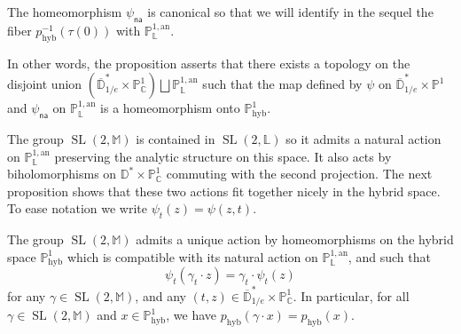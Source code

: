 \documentclass[AHL,Unicode,longabstracts]{cedram}
\DeclareMathOperator{\hyb}{hyb}
\DeclareMathOperator{\SL}{SL}
\newcommand{\cc}{\mathbb{C}}
\newcommand{\phyb}{{\mathbb{P}^1_{\mathrm{hyb}}}}
\newcommand{\mm}{\mathbb{M}}
\newcommand{\D}{\mathbb{D}}
\newcommand{\an}{\mathrm{an}}
\newcommand{\PP}{\mathbb{P}}
\newcommand{\Laurent}{\mathbb{L}}
\newcommand{\lrpar}[1]{\left(#1\right)}
\newcommand{\na}{\mathsf{na}}
\newcommand{\inv}{^{-1}}
\begin{document}
The homeomorphism $\psi_\na$ is canonical so that we will identify in the sequel the fiber $p_{\hyb}\inv(\tau(0))$ with $\PP^{1,\an}_{\Laurent}$.

\begin{rema}
In other words, the proposition asserts that there exists a topology on the disjoint union $\lrpar{\overline{\D}^*_{1/e} \times \PP^1_\cc } \bigsqcup \PP^{1,\an}_{\Laurent}$ such that the map defined by $\psi$ on $\overline{\D}^*_{1/e} \times \PP^1 $ and $\psi_\na$ on $\PP^{1,\an}_{\Laurent}$ is a homeomorphism onto $\phyb$.
\end{rema}

The group $\SL(2,\mm)$ is contained in $\SL(2,\Laurent)$ so it admits a natural action on $\PP^{1,\an}_{\Laurent}$ preserving the analytic structure on this space. It also acts by biholomorphisms on $ \D^*\times \PP^1_\cc $ commuting with the second projection. The next proposition shows that these two actions fit together nicely in the hybrid space. To ease notation we write $\psi_t(z) = \psi(z,t)$.

\begin{prop}\label{prop:action hybrid}
The group $\SL(2,\mm)$ admits a unique action by homeomorphisms on the hybrid space $\PP^1_{\hyb}$ which is compatible with its natural action on $\PP^{1,\an}_{\Laurent}$, and such that
\begin{equation}\label{eq:321}
\psi_t (\gamma_t \cdot z) = \gamma_t \cdot \psi_t(z)
\end{equation}
for any $\gamma\in \SL(2,\mm)$, and any $(t,z)\in \overline{\D}^*_{1/e} \times\PP^1_\cc $. In particular, for all $\gamma\in \SL(2,\mm)$ and $x\in \phyb$, we have $p_{\hyb} (\gamma \cdot x) = p_{\hyb} (x)$.
\end{prop}
\end{document}
